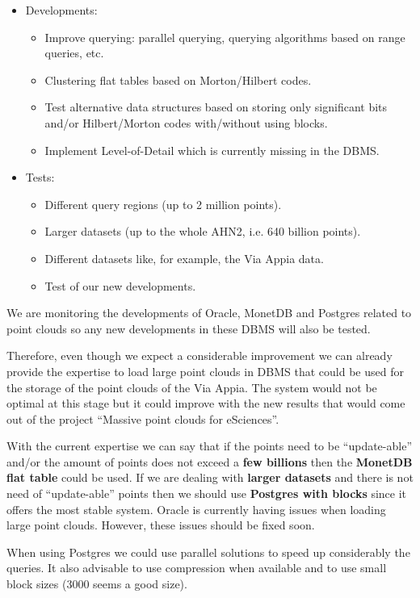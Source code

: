\documentclass[a4paper,11pt]{article}
\begin{document}
\begin{itemize}
	\item Developments:
	\begin{itemize}
		\item Improve querying: parallel querying, querying algorithms based on range queries, etc.
		\item Clustering flat tables based on Morton/Hilbert codes.
		\item Test alternative data structures based on storing only significant bits and/or Hilbert/Morton codes with/without using blocks.
		\item Implement Level-of-Detail which is currently missing in the DBMS.
	\end{itemize}
	\item Tests:
	\begin{itemize}
		\item Different query regions (up to 2 million points).
		\item Larger datasets (up to the whole AHN2, i.e. 640 billion points).
		\item Different datasets like, for example, the Via Appia data.
		\item Test of our new developments.
	\end{itemize}
\end{itemize}

We are monitoring the developments of Oracle, MonetDB and Postgres related to point clouds so any new developments in these DBMS will also be tested.

Therefore, even though we expect a considerable improvement we can already provide the expertise to load large point clouds in DBMS that could be used for the storage of the point clouds of the Via Appia. The system would not be optimal at this stage but it could improve with the new results that would come out of the project ``Massive point clouds for eSciences''.

With the current expertise we can say that if the points need to be ``update-able'' and/or the amount of points does not exceed a \textbf{few billions} then the \textbf{MonetDB flat table} could be used.
If we are dealing with \textbf{larger datasets} and there is not need of ``update-able'' points then we should use \textbf{Postgres with blocks} since it offers the most stable system. Oracle is currently having issues when loading large point clouds. However, these issues should be fixed soon.

When using Postgres we could use parallel solutions to speed up considerably the queries. It also advisable to use compression when available and to use small block sizes (3000 seems a good size). 
\end{document}

